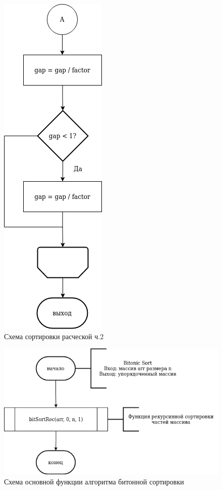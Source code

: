 \documentclass[12pt]{report}
\begin{document}
	\begin{figure}[H]
		\centering
		\includegraphics{combSort_2}
		\caption{Схема сортировки расческой ч.2}
		\label{fig:schema_selection}
	\end{figure}
	
	\begin{figure}[H]
		\centering
		\includegraphics{bitonic_1}
		\caption{Схема основной функции алгоритма битонной сортировки}
		\label{fig:schema_insertion}
	\end{figure}
	
\end{document}
